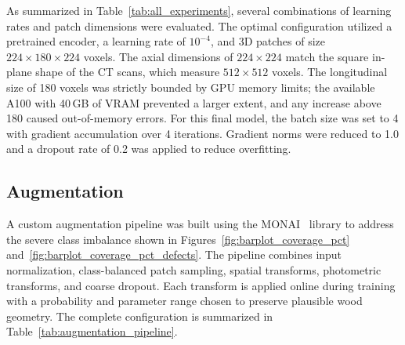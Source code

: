 As summarized in Table~\ref{tab:all_experiments}, several combinations of learning rates and patch dimensions were evaluated. The optimal configuration utilized a pretrained encoder, a learning rate of $10^{-4}$, and 3D patches of size $224 \times 180 \times 224$ voxels. The axial dimensions of $224 \times 224$ match the square in-plane shape of the CT scans, which measure $512 \times 512$ voxels. The longitudinal size of 180 voxels was strictly bounded by GPU memory limits; the available A100 with 40\,GB of VRAM prevented a larger extent, and any increase above 180 caused out-of-memory errors. For this final model, the batch size was set to 4 with gradient accumulation over 4 iterations. Gradient norms were reduced to 1.0 and a dropout rate of 0.2 was applied to reduce overfitting.

\subsection{Augmentation}
\label{sec:custom_augmentation}

A custom augmentation pipeline was built using the MONAI~\cite{cardoso2022monai} library to address the severe class imbalance shown in Figures~\ref{fig:barplot_coverage_pct} and~\ref{fig:barplot_coverage_pct_defects}. The pipeline combines input normalization, class-balanced patch sampling, spatial transforms, photometric transforms, and coarse dropout. Each transform is applied online during training with a probability and parameter range chosen to preserve plausible wood geometry. The complete configuration is summarized in Table~\ref{tab:augmentation_pipeline}.

